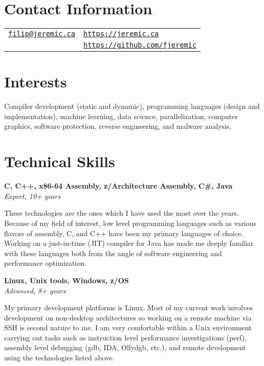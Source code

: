 \documentclass[margin,line]{res}
\begin{document}

\begin{resume}
\section{\sc Contact Information}

\vspace{.05in}

\begin{tabular}{@{}p{3.36in}p{3in}}
\href{mailto:filip@jeremic.ca}{\texttt{filip@jeremic.ca}} & \href{https://jeremic.ca}{\texttt{https://jeremic.ca}} \\
& \href{https://github.com/fjeremic}{\texttt{https://github.com/fjeremic}}
\end{tabular}

\section{\sc Interests}

Compiler development (static and dynamic), programming languages (design and implementation), machine learning, data
science, parallelization, computer graphics, software protection, reverse engineering, and malware analysis.

\section{\sc Technical \newline Skills}

{\bf C, C++, x86-64 Assembly, z/Architecture Assembly, C\#, Java} \\
{\em Expert, 10+ years}

These technologies are the ones which I have used the most over the years. Because of my field of interest, low level
programming languages such as various flavors of assembly, C, and C++ have been my primary languages of choice.
Working on a just-in-time (JIT) compiler for Java has made me deeply familiar with these languages both
from the angle of software engineering and performance optimization.

{\bf Linux, Unix tools, Windows, z/OS } \\
{\em Advanced, 8+ years}

My primary development platforms is Linux. Most of my current work involves development on non-desktop
architectures so working on a remote machine via SSH is second nature to me. I am very comfortable within a Unix
environment carrying out tasks such as instruction level performance investigations (perf), assembly level debugging 
(gdb, IDA, Ollydgb, etc.), and remote development using the technologies listed above.


\end{resume}
\end{document}
